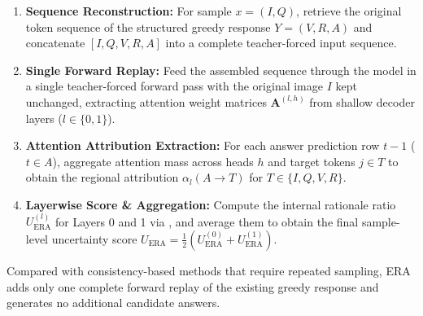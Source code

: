 \begin{enumerate}[label=\textbf{Step \arabic*:}, leftmargin=5.2em, labelsep=0.7em]
\item \textbf{Sequence Reconstruction:} For sample $x=(I,Q)$, retrieve the original token sequence of the structured greedy response $Y=(V,R,A)$ and concatenate $[I,Q,V,R,A]$ into a complete teacher-forced input sequence.
\item \textbf{Single Forward Replay:} Feed the assembled sequence through the model in a single teacher-forced forward pass with the original image $I$ kept unchanged, extracting attention weight matrices $\mathbf{A}^{(l,h)}$ from shallow decoder layers ($l \in \{0, 1\}$).
\item \textbf{Attention Attribution Extraction:} For each answer prediction row $t-1$ ($t \in A$), aggregate attention mass across heads $h$ and target tokens $j \in T$ to obtain the regional attribution $\alpha_l(A \rightarrow T)$ for $T \in \{I, Q, V, R\}$.
\item \textbf{Layerwise Score \& Aggregation:} Compute the internal rationale ratio $U_{\mathrm{ERA}}^{(l)}$ for Layers 0 and 1 via , and average them to obtain the final sample-level uncertainty score $U_{\mathrm{ERA}} = \frac{1}{2}(U_{\mathrm{ERA}}^{(0)} + U_{\mathrm{ERA}}^{(1)})$.
\end{enumerate}

Compared with consistency-based methods that require repeated sampling, ERA adds only one complete forward replay of the existing greedy response and generates no additional candidate answers.
